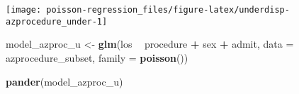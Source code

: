 \documentclass[ngerman,a4paper,]{scrartcl}
\newenvironment{Shaded}{\begin{snugshade}}{\end{snugshade}}
\newcommand{\DataTypeTok}[1]{\textcolor[rgb]{0.13,0.29,0.53}{#1}}
\newcommand{\KeywordTok}[1]{\textcolor[rgb]{0.13,0.29,0.53}{\textbf{#1}}}
\newcommand{\NormalTok}[1]{#1}
\newcommand{\OperatorTok}[1]{\textcolor[rgb]{0.81,0.36,0.00}{\textbf{#1}}}
\newcommand{\StringTok}[1]{\textcolor[rgb]{0.31,0.60,0.02}{#1}}
\theoremstyle{definition}
\theoremstyle{definition}
\theoremstyle{definition}
\theoremstyle{remark}
\begin{document}
\begin{center}\texttt{[image: poisson-regression\_files/figure-latex/underdisp-azprocedure\_under-1]} \end{center}

\begin{Shaded}
\begin{Highlighting}[]
\NormalTok{model_azproc_u <-}\StringTok{ }\KeywordTok{glm}\NormalTok{(los }\OperatorTok{~}\StringTok{ }\NormalTok{procedure }\OperatorTok{+}\StringTok{ }\NormalTok{sex }\OperatorTok{+}\StringTok{ }\NormalTok{admit, }
                      \DataTypeTok{data =}\NormalTok{ azprocedure_subset, }\DataTypeTok{family =} \KeywordTok{poisson}\NormalTok{())}

\KeywordTok{pander}\NormalTok{(model_azproc_u)}
\end{Highlighting}
\end{Shaded}
\end{document}
